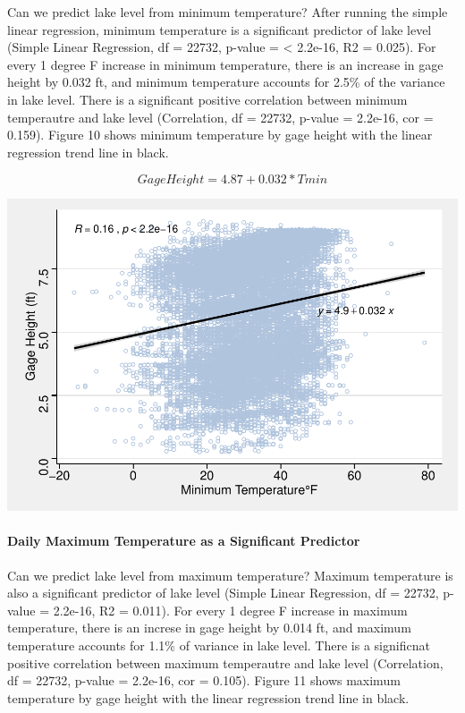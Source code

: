 \documentclass[12pt,]{article}
\let\oldparagraph\paragraph
\renewcommand{\paragraph}[1]{\oldparagraph{#1}\mbox{}}
\let\origfigure\figure
\let\endorigfigure\endfigure
\renewenvironment{figure}[1][2] {
    \expandafter\origfigure\expandafter[H]
} {
    \endorigfigure
}
\begin{document}
Can we predict lake level from minimum temperature? After running the
simple linear regression, minimum temperature is a significant predictor
of lake level (Simple Linear Regression, df = 22732, p-value =
\textless{} 2.2e-16, R2 = 0.025). For every 1 degree F increase in
minimum temperature, there is an increase in gage height by 0.032 ft,
and minimum temperature accounts for 2.5\% of the variance in lake
level. There is a significant positive correlation between minimum
temperautre and lake level (Correlation, df = 22732, p-value = 2.2e-16,
cor = 0.159). Figure 10 shows minimum temperature by gage height with
the linear regression trend line in black.

\[Gage Height = 4.87 + 0.032*Tmin \]

\begin{figure}
\centering
\includegraphics{Shintaku_ENV872_Project_files/figure-latex/unnamed-chunk-13-1.pdf}
\caption{Minimum temperature by gage height with trend line in black}
\end{figure}

\hypertarget{daily-maximum-temperature-as-a-significant-predictor}{%
\paragraph{Daily Maximum Temperature as a Significant
Predictor}\label{daily-maximum-temperature-as-a-significant-predictor}}

Can we predict lake level from maximum temperature? Maximum temperature
is also a significant predictor of lake level (Simple Linear Regression,
df = 22732, p-value = 2.2e-16, R2 = 0.011). For every 1 degree F
increase in maximum temperature, there is an increse in gage height by
0.014 ft, and maximum temperature accounts for 1.1\% of variance in lake
level. There is a significnat positive correlation between maximum
temperautre and lake level (Correlation, df = 22732, p-value = 2.2e-16,
cor = 0.105). Figure 11 shows maximum temperature by gage height with
the linear regression trend line in black.
\end{document}
